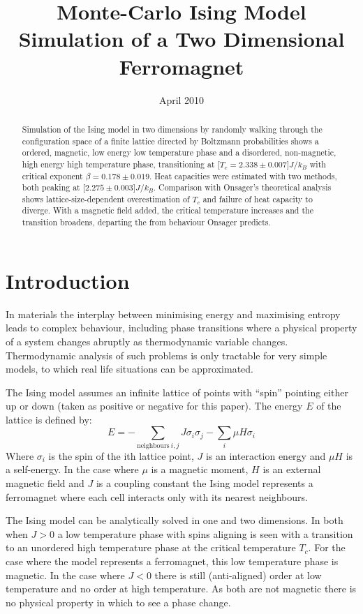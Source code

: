 \documentclass[12pt,a4paper,english]{article}
\author{}
\date{April 2010}
\title{Monte-Carlo Ising Model Simulation of a Two Dimensional Ferromagnet}
\begin{document}
\maketitle

\begin{abstract}
Simulation of the Ising model in two dimensions by randomly walking through the configuration space of a finite lattice directed by Boltzmann probabilities shows a ordered, magnetic, low energy low temperature phase and a disordered, non-magnetic, high energy high temperature phase, transitioning at \unit[$T_c=2.338\pm0.007$]{$J/k_B$} with critical exponent $\beta=0.178\pm0.019$. Heat capacities were estimated with two methods, both peaking at \unit[$2.275\pm0.003$]{$J/k_B$}. Comparison with Onsager's theoretical analysis shows lattice-size-dependent overestimation of $T_c$ and failure of heat capacity to diverge.  With a magnetic field added, the critical temperature increases and the transition broadens, departing the from behaviour Onsager predicts.
\end{abstract}

\section{Introduction}
\label{sec:introduction}
In materials the interplay between minimising energy and maximising entropy leads to complex behaviour, including phase transitions where a physical property of a system changes abruptly as thermodynamic variable changes.  Thermodynamic analysis of such problems is only tractable for very simple models, to which real life situations can be approximated.

The Ising model\cite{brush67} assumes an infinite lattice of points with ``spin'' pointing either up or down (taken as positive or negative for this paper).  The energy $E$ of the lattice is defined by:
\begin{equation}
\label{eq:ising-energy}
E = - \sum_{\mathrm{neighbours}\: i,j} J \sigma_i \sigma_j - \sum_i \mu H \sigma_i
\end{equation}
Where $\sigma_i$ is the spin of the ith lattice point, $J$ is an interaction energy and $\mu H$ is a self-energy.  In the case where $\mu$ is a magnetic moment, $H$ is an external magnetic field and $J$ is a coupling constant the Ising model represents a ferromagnet where each cell interacts only with its nearest neighbours.

The Ising model can be analytically solved in one and two dimensions.  In both when $J>0$ a low temperature phase with spins aligning is seen with a transition to an unordered high temperature phase at the critical temperature $T_c$.  For the case where the model represents a ferromagnet, this low temperature phase is magnetic.  In the case where $J<0$ there is still (anti-aligned) order at low temperature and no order at high temperature.  As both are not magnetic there is no physical property in which to see a phase change.
\end{document}
